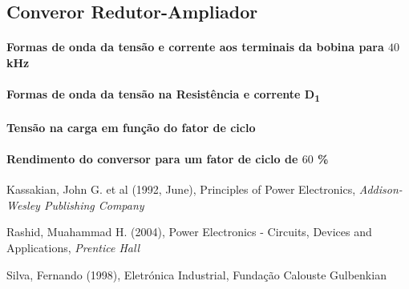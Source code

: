 \documentclass[a4paper,11pt]{article}
\numberwithin{equation}{section}
\begin{document}
\subsection{Converor Redutor-Ampliador}

\paragraph{Formas de onda da tensão e corrente aos terminais da bobina para $40$ kHz}

\paragraph{Formas de onda da tensão na Resistência e corrente D\textsubscript{1}}

\paragraph{Tensão na carga em função do fator de ciclo}

\paragraph{Rendimento do conversor para um fator de ciclo de $60$ \%}

\pagebreak

\begin{thebibliography}{2}
	
	Kassakian, John G. et al (1992, June), Principles of Power Electronics, \textit{Addison-Wesley Publishing Company}

	Rashid, Muahammad H. (2004), Power Electronics - Circuits, Devices and Applications, \textit{Prentice Hall}
	
	Silva, Fernando (1998), Eletrónica Industrial, Fundação Calouste Gulbenkian
	
\end{thebibliography}


\pagebreak
\end{document}
